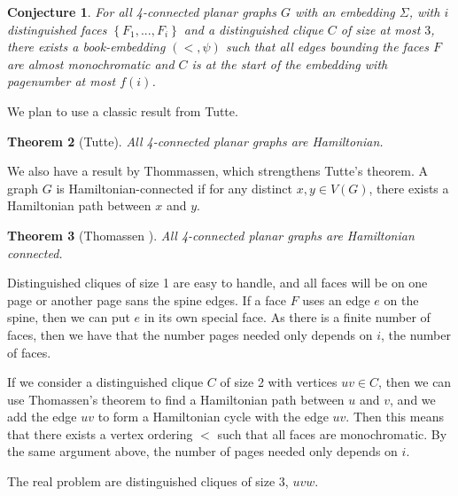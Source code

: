 \documentclass[]{report}
\newtheorem{theorem}{Theorem}
\newtheorem{conjecture}[theorem]{Conjecture}
\theoremstyle{definition}
\numberwithin{theorem}{section}
\numberwithin{equation}{section}
\begin{document}
\begin{conjecture}\label{conj:4-planar graphs}
	For all 4-connected planar graphs $G$ with an embedding $\Sigma$, with $i$ distinguished faces $\left\lbrace F_1, ..., F_i \right\rbrace$ and a distinguished clique $C$ of size at most $3$, there exists a book-embedding $(<, \psi)$ such that all edges bounding the faces $F$ are almost monochromatic and $C$ is at the start of the embedding with pagenumber at most $f(i)$.
\end{conjecture}
We plan to use a classic result from Tutte.
\begin{theorem}[Tutte\cite{tutteTheoremPlanarGraphs1956}]\label{thm:4-connected_planar_ham_cycle}
	All 4-connected planar graphs are Hamiltonian.
\end{theorem}

We also have a result by Thommassen, which strengthens Tutte's theorem. A graph $G$ is Hamiltonian-connected if for any distinct $x, y \in V(G)$, there exists a Hamiltonian path between $x$ and $y$.
\begin{theorem}[Thomassen \cite{thomassenTheoremPathsPlanar1983}]\label{thm:4 Connected Planar Ham-Connected}
	All 4-connected planar graphs are Hamiltonian connected.
\end{theorem}
Distinguished cliques of size 1 are easy to handle, and all faces will be on one page or another page sans the spine edges. If a face $F$ uses an edge $e$ on the spine, then we can put $e$ in its own special face. As there is a finite number of faces, then we have that the number pages needed only depends on $i$, the number of faces.

If we consider a distinguished clique $C$ of size 2 with vertices $uv \in C$, then we can use Thomassen's theorem to find a Hamiltonian path between $u$ and $v$, and we add the edge $uv$ to form a Hamiltonian cycle with the edge $uv$. Then this means that there exists a vertex ordering $<$ such that all faces are monochromatic. By the same argument above, the number of pages needed only depends on $i$.

The real problem are distinguished cliques of size $3$, $uvw$. 
\end{document}
